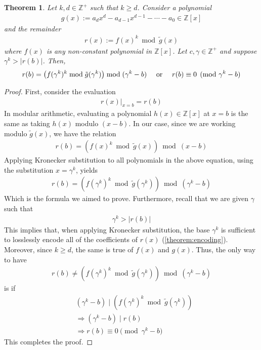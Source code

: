 \documentclass[11pt,reqno]{article}
\theoremstyle{plain}
\newtheorem{theorem}{Theorem}
\theoremstyle{definition}
\newcommand{\eval}[2]{\left . #1 \right|_{#2}}
\begin{document}
\begin{theorem} \label{theorem:kroneckerqrings}
Let $k, d \in \mathbb{Z}^+$ such that $k \geq d$. Consider a polynomial
\begin{align*}
g(x) := a_d x^d - a_{d-1} x^{d-1} - \cdots - a_0 \in \mathbb{Z}[x]
\end{align*}
and the remainder
\begin{align*}
r(x) := f(x)^k  \bmod{\tilde{g}(x)}
\end{align*}
where $f(x)$ is any non-constant polynomial in $\mathbb{Z}[x]$. Let $c, \gamma \in \mathbb{Z}^+$ and suppose $\gamma^k > |r(b)|$. Then,
\begin{align*}
r(b) = \left(f(\gamma^k)^k \bmod{\tilde{g}(\gamma^k)}\right) \bmod{(\gamma^k - b)}
\quad \textup{ or }
\quad r(b) \equiv 0 \pmod{\gamma^k - b}
\end{align*}
\end{theorem}
\begin{proof}
First, consider the evaluation 
\begin{align*}
    \eval{r(x)}{x=b} = r(b)
\end{align*}
In modular arithmetic, evaluating a polynomial $h(x) \in \mathbb{Z}[x]$ at $x=b$ is the same as taking $h(x)$ modulo $(x - b)$. In our case, since we are working modulo $\tilde{g}(x)$, we have the relation
\begin{align*}
    r(b) = \left(f(x)^k \bmod{\tilde{g}(x)}\right) \bmod{(x - b)}
\end{align*}
Applying Kronecker substitution to all polynomials in the above equation, using the substitution $x = \gamma^k$, yields
\begin{align*}
    r(b) = \left(f(\gamma^k)^k \bmod{\tilde{g}(\gamma^k)}\right) \bmod{(\gamma^k - b)}
\end{align*}
Which is the formula we aimed to prove. Furthermore, recall that we are given $\gamma$ such that
\begin{align*}
    \gamma^k > |r(b)|
\end{align*}
This implies that, when applying Kronecker substitution, the base $\gamma^k$ is sufficient to losslessly encode all of the coefficients of $r(x)$ (\cref{theorem:encoding}). Moreover, since $k \geq d$, the same is true of $f(x)$ and $g(x)$. Thus, the only way to have
\begin{align*}
    r(b) \not= \left(f(\gamma^k)^k \bmod{\tilde{g}(\gamma^k)}\right) \bmod{(\gamma^k - b)}
\end{align*}
is if
\begin{align*}
    & (\gamma^k - b) \mid (f(\gamma^k)^k \bmod{\tilde{g}(\gamma^k)}) \\
    & \Longrightarrow (\gamma^k - b) \mid r(b) \\
    & \Longrightarrow r(b) \equiv 0 \pmod{\gamma^k - b}
\end{align*}
This completes the proof.
\end{proof}
\end{document}

